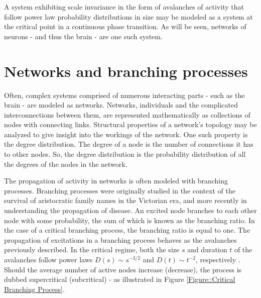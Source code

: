 \documentclass[12pt]{article}
\begin{document}
A system exhibiting scale invariance in the form of avalanches of activity that follow power law probability distributions in size may be modeled as a system at the critical point in a continuous phase transition. As will be seen, networks of neurons - and thus the brain - are one such system.

\section*{Networks and branching processes}

Often, complex systems comprised of numerous interacting parts - such as the brain - are modeled as networks. Networks, individuals and the complicated interconnections between them, are represented mathematically as collections of nodes with connecting links. Structural properties of a network's topology may be analyzed to give insight into the workings of the network. One such property is the degree distribution. The degree of a node is the number of connections it has to other nodes. So, the degree distribution is the probability distribution of all the degrees of the nodes in the network. 

The propagation of activity in networks is often modeled with branching processes. Branching processes were originally studied in the context of the survival of aristocratic family names in the Victorian era\cite{Watson2014}, and more recently in understanding the propagation of disease. An excited node branches to each other node with some probability, the sum of which is known as the branching ratio. In the case of a critical branching process, the branching ratio is equal to one. The propagation of excitations in a branching process behaves as the avalanches previously described. In the critical regime, both the size $s$ and duration $t$ of the avalanches follow power laws $ D(s) \sim s^{-3/2} $ and $ D(t) \sim t^{-2} $, respectively \cite{Larremore2014}. Should the average number of active nodes increase (decrease), the process is dubbed supercritical (subcritical) - as illustrated in Figure \ref{Figure::Critical Branching Process}. 
\end{document}
